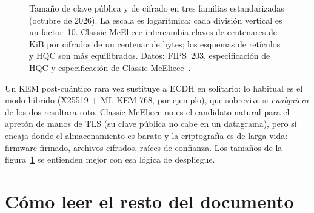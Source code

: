 \documentclass[11pt,a4paper,oneside]{report}
\begin{document}
\begin{figure}[htbp]
\centering
{}
\caption{Tamaño de clave pública y de cifrado en tres familias
estandarizadas (octubre de 2026). La escala es logarítmica: cada
división vertical es un factor~10. Classic McEliece intercambia claves de
centenares de KiB por cifrados de un centenar de bytes; los esquemas de
retículos y HQC son más equilibrados. Datos: FIPS~203, especificación de
HQC y especificación de Classic McEliece~\cite{fips203,hqcspec,cmspec}.}
\label{fig:tamanos}
\end{figure}

\begin{practica}
Un KEM post-cuántico rara vez sustituye a ECDH en solitario: lo habitual es
el modo híbrido (X25519 + ML-KEM-768, por ejemplo), que sobrevive si
\emph{cualquiera} de los dos resultara roto. Classic McEliece no es el
candidato natural para el apretón de manos de TLS (su clave pública no
cabe en un datagrama), pero sí encaja donde el almacenamiento es barato y
la criptografía es de larga vida: firmware firmado, archivos cifrados,
raíces de confianza. Los tamaños de la figura~\ref{fig:tamanos} se
entienden mejor con esa lógica de despliegue.
\end{practica}

\section{Cómo leer el resto del documento}
\end{document}
